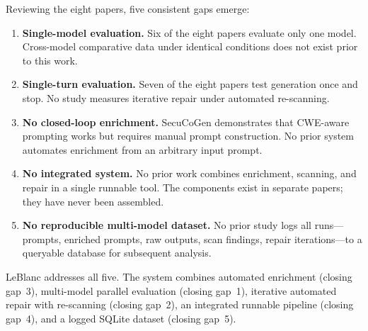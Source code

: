 \documentclass[12pt,a4paper]{report}
\begin{document}
Reviewing the eight papers, five consistent gaps emerge:

\begin{enumerate}
  \item \textbf{Single-model evaluation.} Six of the eight papers evaluate only
        one model. Cross-model comparative data under identical conditions does
        not exist prior to this work.

  \item \textbf{Single-turn evaluation.} Seven of the eight papers test generation
        once and stop. No study measures iterative repair under automated
        re-scanning.

  \item \textbf{No closed-loop enrichment.} SecuCoGen demonstrates that
        CWE-aware prompting works but requires manual prompt construction. No
        prior system automates enrichment from an arbitrary input prompt.

  \item \textbf{No integrated system.} No prior work combines enrichment,
        scanning, and repair in a single runnable tool. The components exist
        in separate papers; they have never been assembled.

  \item \textbf{No reproducible multi-model dataset.} No prior study logs all
        runs---prompts, enriched prompts, raw outputs, scan findings, repair
        iterations---to a queryable database for subsequent analysis.
\end{enumerate}

LeBlanc addresses all five. The system combines automated enrichment (closing
gap~3), multi-model parallel evaluation (closing gap~1), iterative automated
repair with re-scanning (closing gap~2), an integrated runnable pipeline
(closing gap~4), and a logged SQLite dataset (closing gap~5).

\printbibliography[heading=none]
\end{document}
